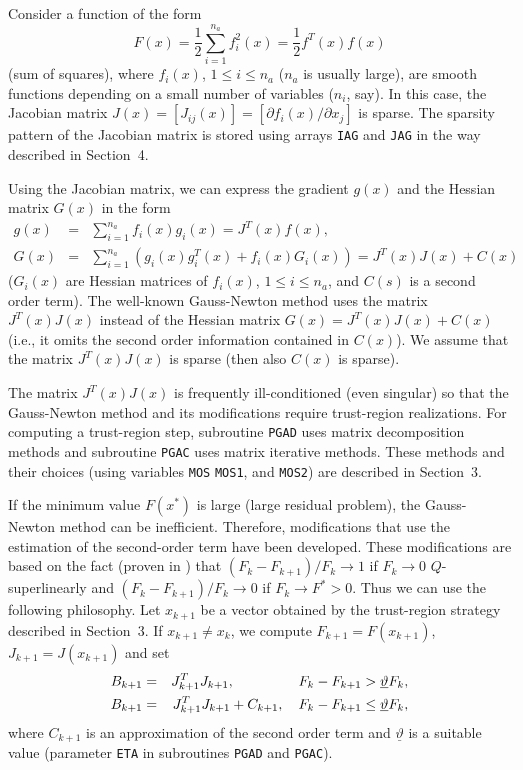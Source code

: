 \documentclass{esub2acm}
\newcommand{\be}{\begin{equation}}
\newcommand{\ee}{\end{equation}}
\newcommand{\beq}{\begin{eqnarray*}}
\newcommand{\eeq}{\end{eqnarray*}}
\begin{document}
\vspace{3mm}

\noindent Consider a function of the form
%
\be
F(x) = \frac{1}{2} \sum_{i=1}^{n_a} f_i^2(x) = \frac{1}{2} f^T(x) f(x)
\label{5.1}
\ee
%
(sum of squares), where $f_i(x)$, $1 \leq i \leq n_a$ ($n_a$ is usually large), are
smooth functions depending on a small number of variables ($n_i$, say). In this
case, the Jacobian matrix $J(x) = [J_{ij}(x)] = [\partial f_i(x)/\partial x_j]$
is sparse. The sparsity pattern of the Jacobian matrix is stored using arrays
{\tt IAG} and {\tt JAG} in the way described in Section~4.

Using the Jacobian matrix, we can express the gradient $g(x)$ and the Hessian
matrix $G(x)$ in the form
%
\beq
g(x) & = & \sum_{i=1}^{n_a}  f_i(x) g_i(x) = J^T(x) f(x), \\
G(x) & = & \sum_{i=1}^{n_a} \left(g_i(x) g_i^T(x) + f_i(x) G_i(x)\right) = J^T(x)J(x) + C(x)
\eeq
%
($G_i(x)$ are Hessian matrices of $f_i(x)$, $1 \leq i \leq n_a$, and $C(s)$
is a second order term).
The well-known Gauss-Newton method uses the matrix $J^T(x)J(x)$ instead
of the Hessian matrix $G(x) = J^T(x)J(x) + C(x)$ (i.e., it omits the second
order information contained in $C(x)$). We assume that the matrix $J^T(x)J(x)$
is sparse (then also $C(x)$ is sparse).

The matrix $J^T(x)J(x)$ is frequently ill-conditioned (even singular) so that
the Gauss-Newton method and its modifications require trust-region
realizations. For computing a trust-region step, subroutine {\tt PGAD}
uses matrix decomposition methods and subroutine {\tt PGAC} uses matrix
iterative methods. These methods and their choices (using variables {\tt MOS}
{\tt MOS1}, and {\tt MOS2}) are described in Section~3.

If the minimum value $F(x^*)$ is large (large residual problem), the
Gauss-Newton method can be inefficient. Therefore, modifications that use
the estimation of the second-order term have been developed. These modifications
are based on the fact (proven in \cite{abf1}) that $(F_k - F_{k+1})/F_k \to 1$
if $F_k \to 0$ $Q$-superlinearly and $(F_k - F_{k+1})/F_k \to 0$ if
$F_k \rightarrow F^* > 0$. Thus we can use the following philosophy.
Let $x_{k+1}$ be a vector obtained by the trust-region strategy
described in Section~3. If $x_{k+1} \neq x_k$, %
we compute $F_{k+1} = F(x_{k+1})$, $J_{k+1} = J(x_{k+1})$ and set
%
\beq
B_{k+1} & = & J_{k+1}^T J_{k+1}, \hspace{16mm} F_k - F_{k+1} > \underline{\vartheta} F_k, \\
B_{k+1} & = & J_{k+1}^T J_{k+1} + C_{k+1}, \quad F_k - F_{k+1} \leq \underline{\vartheta} F_k,
\eeq
%
where $C_{k+1}$ is an approximation of the second order term and $\underline{\vartheta}$ is
a suitable value (parameter {\tt ETA} in subroutines {\tt PGAD} and {\tt PGAC}).
\end{document}
